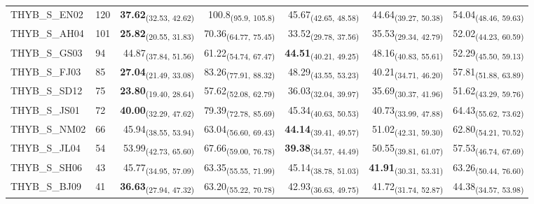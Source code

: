\begin{table}[p]
\begin{tabular}{llrrrrr}
THYB\_S\_EN02 & 120 & \textbf{37.62}\textsubscript{(32.53, 42.62)} & 100.8\textsubscript{(95.9, 105.8)} & 45.67\textsubscript{(42.65, 48.58)} & 44.64\textsubscript{(39.27, 50.38)} & 54.04\textsubscript{(48.46, 59.63)} \\
THYB\_S\_AH04 & 101 & \textbf{25.82}\textsubscript{(20.55, 31.83)} & 70.36\textsubscript{(64.77, 75.45)} & 33.52\textsubscript{(29.78, 37.56)} & 35.53\textsubscript{(29.34, 42.79)} & 52.02\textsubscript{(44.23, 60.59)} \\
THYB\_S\_GS03 & 94 & 44.87\textsubscript{(37.84, 51.56)} & 61.22\textsubscript{(54.74, 67.47)} & \textbf{44.51}\textsubscript{(40.21, 49.25)} & 48.16\textsubscript{(40.83, 55.61)} & 52.29\textsubscript{(45.50, 59.13)} \\
THYB\_S\_FJ03 & 85 & \textbf{27.04}\textsubscript{(21.49, 33.08)} & 83.26\textsubscript{(77.91, 88.32)} & 48.29\textsubscript{(43.55, 53.23)} & 40.21\textsubscript{(34.71, 46.20)} & 57.81\textsubscript{(51.88, 63.89)} \\
THYB\_S\_SD12 & 75 & \textbf{23.80}\textsubscript{(19.40, 28.64)} & 57.62\textsubscript{(52.08, 62.79)} & 36.03\textsubscript{(32.04, 39.97)} & 35.69\textsubscript{(30.37, 41.96)} & 51.62\textsubscript{(43.29, 59.76)} \\
THYB\_S\_JS01 & 72 & \textbf{40.00}\textsubscript{(32.29, 47.62)} & 79.39\textsubscript{(72.78, 85.69)} & 45.34\textsubscript{(40.63, 50.53)} & 40.73\textsubscript{(33.99, 47.88)} & 64.43\textsubscript{(55.62, 73.62)} \\
THYB\_S\_NM02 & 66 & 45.94\textsubscript{(38.55, 53.94)} & 63.04\textsubscript{(56.60, 69.43)} & \textbf{44.14}\textsubscript{(39.41, 49.57)} & 51.02\textsubscript{(42.31, 59.30)} & 62.80\textsubscript{(54.21, 70.52)} \\
THYB\_S\_JL04 & 54 & 53.99\textsubscript{(42.73, 65.60)} & 67.66\textsubscript{(59.00, 76.78)} & \textbf{39.38}\textsubscript{(34.57, 44.49)} & 50.55\textsubscript{(39.81, 61.07)} & 57.53\textsubscript{(46.74, 67.69)} \\
THYB\_S\_SH06 & 43 & 45.77\textsubscript{(34.95, 57.09)} & 63.35\textsubscript{(55.55, 71.99)} & 45.14\textsubscript{(38.78, 51.03)} & \textbf{41.91}\textsubscript{(30.31, 53.31)} & 63.26\textsubscript{(50.44, 76.60)} \\
THYB\_S\_BJ09 & 41 & \textbf{36.63}\textsubscript{(27.94, 47.32)} & 63.20\textsubscript{(55.22, 70.78)} & 42.93\textsubscript{(36.63, 49.75)} & 41.72\textsubscript{(31.74, 52.87)} & 44.38\textsubscript{(34.57, 53.98)} \\

\end{tabular}
\end{table}
